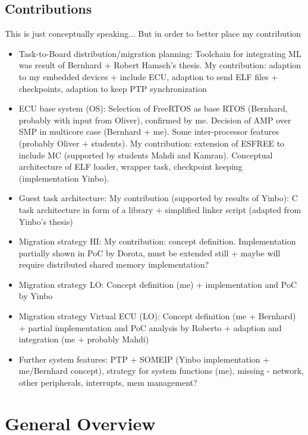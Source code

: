 \subsection{Contributions}
This is just conceptually speaking... But in order to better place my contribution

\begin{itemize}
	\item Task-to-Board distribution/migration planning: Toolchain for integrating ML was result of Bernhard + Robert Hamsch's thesis. My contribution: adaption to my embedded devices + include ECU, adaption to send ELF files + checkpoints, adaption to keep PTP synchronization
	\item ECU base system (OS): Selection of FreeRTOS as base RTOS (Bernhard, probably with input from Oliver), confirmed by me. Decision of AMP over SMP in multicore case (Bernhard + me). Some inter-processor features (probably Oliver + students). My contribution: extension of ESFREE to include MC (supported by students Mahdi and Kamran). Conceptual architecture of ELF loader, wrapper task, checkpoint keeping (implementation Yinbo).
	\item Guest task architecture: My contribution (supported by results of Yinbo): C task architecture in form of a library + simplified linker script (adapted from Yinbo's thesis)
	\item Migration strategy HI: My contribution: concept definition. Implementation partially shown in PoC by Dorota, must be extended still + maybe will require distributed shared memory implementation?
	\item Migration strategy LO: Concept definition (me) + implementation and PoC by Yinbo
	\item Migration strategy Virtual ECU (LO): Concept definition (me + Bernhard) + partial implementation and PoC analysis by Roberto + adaption and integration (me + probably Mahdi)
	\item Further system features: PTP + SOMEIP (Yinbo implementation + me/Bernhard concept), strategy for system functions (me), missing - network, other peripherals, interrupts, mem management? 
\end{itemize}


\section{General Overview}\label{section:descriptionapproach}

